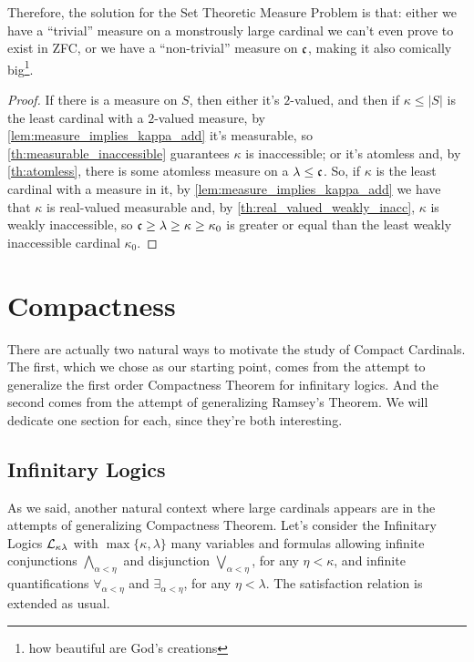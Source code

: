 Therefore, the solution for the Set Theoretic Measure Problem is that: either we have a ``trivial'' measure on a monstrously large cardinal we can't even prove to exist in ZFC, or we have a ``non-trivial'' measure on $\mathfrak{c}$, making it also comically big\footnote{how beautiful are God's creations}.

\begin{proof}
    If there is a measure on $S$, then either it's $2$-valued, and then if $\kappa\leq\lvert S\rvert$ is the least cardinal with a $2$-valued measure, by \cref{lem:measure_implies_kappa_add} it's measurable, so \cref{th:measurable_inaccessible} guarantees $\kappa$ is inaccessible; or it's atomless and, by \cref{th:atomless}, there is some atomless measure on a $\lambda\leq\mathfrak{c}$. So, if $\kappa$ is the least cardinal with a measure in it, by \cref{lem:measure_implies_kappa_add} we have that $\kappa$ is real-valued measurable and, by \cref{th:real_valued_weakly_inacc}, $\kappa$ is weakly inaccessible, so $\mathfrak{c}\geq\lambda\geq\kappa\geq\kappa_0$ is greater or equal than the least weakly inaccessible cardinal $\kappa_0$.
\end{proof}

\section{Compactness}

There are actually two natural ways to motivate the study of Compact Cardinals. The first, which we chose as our starting point, comes from the attempt to generalize the first order Compactness Theorem for infinitary logics. And the second comes from the attempt of generalizing Ramsey's Theorem. We will dedicate one section for each, since they're both interesting.

\subsection{Infinitary Logics}

As we said, another natural context where large cardinals appears are in the attempts of generalizing Compactness Theorem. Let's consider the Infinitary Logics $\mathcal{L}_{\kappa\lambda}$ with $\max\{\kappa,\lambda\}$ many variables and formulas allowing infinite conjunctions $\bigwedge_{\alpha<\eta}$ and disjunction $\bigvee_{\alpha<\eta}$, for any $\eta<\kappa$, and infinite quantifications $\forall_{\alpha<\eta}$ and $\exists_{\alpha<\eta}$, for any $\eta<\lambda$. The satisfaction relation is extended as usual.

